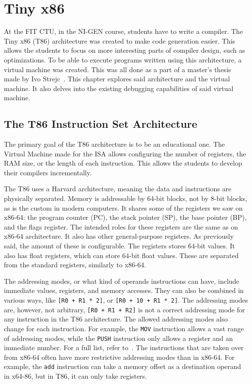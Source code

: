 \chapter{Tiny x86}\label{section:T86}
At the FIT CTU, in the NI-GEN course, students have to write a compiler. The
Tiny x86 (T86) architecture was created to make code generation easier. This
allows the students to focus on more interesting parts of compiler design, such
as optimizations. To be able to execute programs written using this
architecture, a virtual machine was created. This was all done as a part of a
master's thesis made by Ivo Strejc~\cite{ivo2021tiny}. This chapter explores
said architecture and the virtual machine. It also delves into the existing
debugging capabilities of said virtual machine.

\section{The T86 Instruction Set Architecture}
The primary goal of the T86 architecture is to be an educational one. The
Virtual Machine made for the ISA allows configuring the number of registers,
the RAM size, or the length of each instruction. This allows the students to
develop their compilers incrementally.

The T86 uses a Harvard architecture, meaning the data and instructions are
physically separated. Memory is addressable by 64-bit blocks, not by 8-bit
blocks, as is the custom in modern computers. It shares some of the registers
we saw on x86-64: the program counter (PC), the stack pointer (SP), the base
pointer (BP), and the flags register. The intended roles for these registers
are the same as on x86-64 architecture. It also has other general-purpose
registers. As previously said, the amount of these is configurable. The
registers stores 64-bit values. It also has float registers, which can store
64-bit float values. These are separated from the standard registers, similarly
to x86-64.

The addressing modes, or what kind of operands instructions can have, include
immediate values, registers, and memory accesses. They can also be combined in
various ways, like \texttt{[R0 + R1 * 2]}, or \texttt{[R0 + 10 + R1 * 2]}. The
addressing modes are, however, not arbitrary, \texttt{[R0 + R1 + R2]} is not a
correct addressing mode for any instruction in the T86 architecture. The
allowed addressing modes also change for each instruction. For example, the
\texttt{MOV} instruction allows a vast range of addressing modes, while the
\texttt{PUSH} instruction only allows a register and an immediate number. For a
full list, refer to~\cite{ivo2021tiny}. The instructions that are taken over
from x86-64 often have more restrictive addressing modes than in x86-64. For
example, the \verb|add| instruction can take a memory offset as a destination
operand in x64-86, but in T86, it can only take registers.

